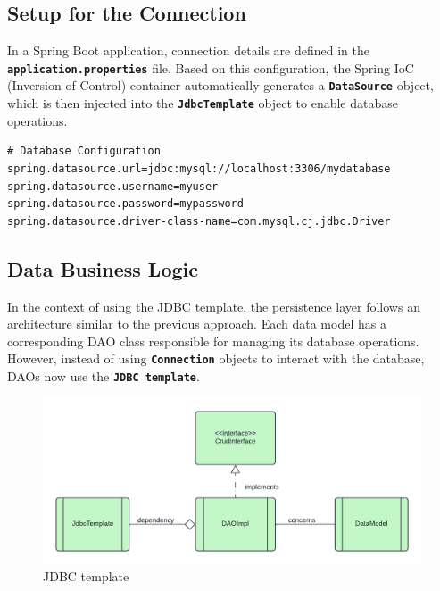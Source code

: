 \documentclass{article}
\begin{document}
\subsection{Setup for the Connection} 
In a Spring Boot application, connection details are defined in the \textbf{\texttt{application.properties}} file. Based on this configuration, the Spring IoC (Inversion of Control) container automatically generates a \textbf{\texttt{DataSource}} object, which is then injected into the \textbf{\texttt{JdbcTemplate}} object to enable database operations.
\\
\begin{lstlisting}[caption={MySQL database configuration}]
# Database Configuration
spring.datasource.url=jdbc:mysql://localhost:3306/mydatabase
spring.datasource.username=myuser
spring.datasource.password=mypassword
spring.datasource.driver-class-name=com.mysql.cj.jdbc.Driver

\end{lstlisting}

\subsection{Data Business Logic}

In the context of using the JDBC template, the persistence layer follows an architecture similar to the previous approach. Each data model has a corresponding DAO class responsible for managing its database operations.
\\
However, instead of using \textbf{\texttt{Connection}} objects to interact with the database, DAOs now use the \textbf{\texttt{JDBC template}}.

\begin{figure}[H]
    \centering
    \begin{framed}
        \includegraphics[width=0.8\linewidth]{images/jdbc_tem_businesslog.png}
    \end{framed}
    \caption{JDBC template}
    \label{fig:spring-logo}
\end{figure}
\end{document}
